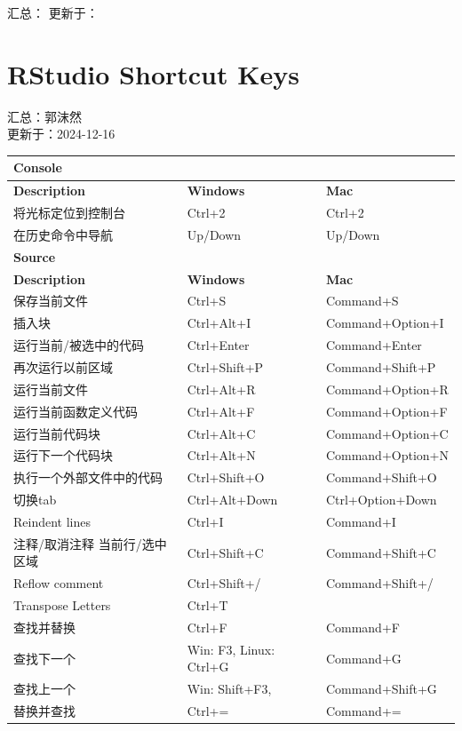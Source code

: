 \documentclass[]{ctexbook}
\theoremstyle{definition}
\theoremstyle{definition}
\theoremstyle{definition}
\theoremstyle{definition}
\theoremstyle{remark}
\begin{document}
汇总：
更新于：

\section{RStudio Shortcut Keys}\label{RStudioShortcutKeys}

汇总：郭沫然\\
更新于：2024-12-16

\begin{longtable}[]{@{}lll@{}}
\toprule\noalign{}
Console & & \\
\midrule\noalign{}
\endhead
\bottomrule\noalign{}
\endlastfoot
\textbf{Description} & \textbf{Windows} & \textbf{Mac} \\
将光标定位到控制台 & Ctrl+2 & Ctrl+2 \\
在历史命令中导航 & Up/Down & Up/Down \\
\textbf{Source} & & \\
\textbf{Description} & \textbf{Windows} & \textbf{Mac} \\
保存当前文件 & Ctrl+S & Command+S \\
插入块 & Ctrl+Alt+I & Command+Option+I \\
运行当前/被选中的代码 & Ctrl+Enter & Command+Enter \\
再次运行以前区域 & Ctrl+Shift+P & Command+Shift+P \\
运行当前文件 & Ctrl+Alt+R & Command+Option+R \\
运行当前函数定义代码 & Ctrl+Alt+F & Command+Option+F \\
运行当前代码块 & Ctrl+Alt+C & Command+Option+C \\
运行下一个代码块 & Ctrl+Alt+N & Command+Option+N \\
执行一个外部文件中的代码 & Ctrl+Shift+O & Command+Shift+O \\
切换tab & Ctrl+Alt+Down & Ctrl+Option+Down \\
Reindent lines & Ctrl+I & Command+I \\
注释/取消注释 当前行/选中区域 & Ctrl+Shift+C & Command+Shift+C \\
Reflow comment & Ctrl+Shift+/ & Command+Shift+/ \\
Transpose Letters & Ctrl+T & \\
查找并替换 & Ctrl+F & Command+F \\
查找下一个 & Win: F3, Linux: Ctrl+G & Command+G \\
查找上一个 & Win: Shift+F3, & Command+Shift+G \\
替换并查找 & Ctrl+= & Command+= \\

\end{longtable}
\end{document}
